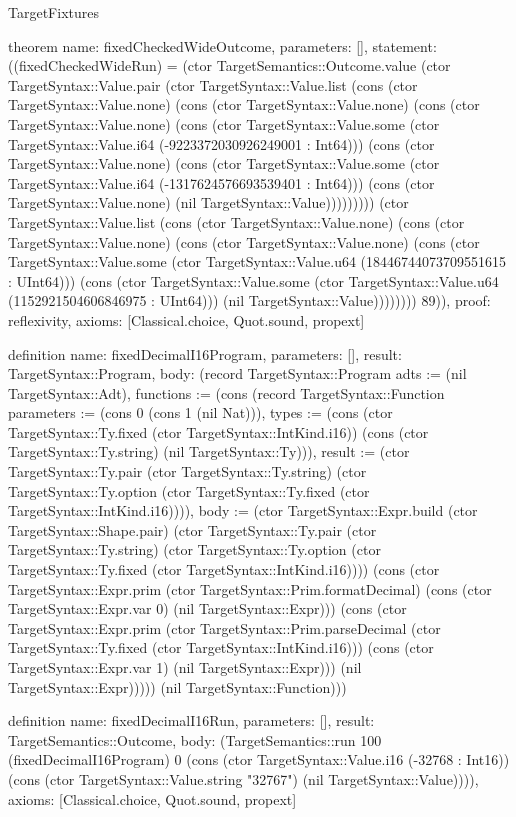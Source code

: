 \begin{lexlean}{TargetFixtures}
\begin{semanticmodule}
theorem{
  name: fixedCheckedWideOutcome,
  parameters: [],
  statement: ((fixedCheckedWideRun) = (ctor TargetSemantics::Outcome.value (ctor TargetSyntax::Value.pair (ctor TargetSyntax::Value.list (cons (ctor TargetSyntax::Value.none) (cons (ctor TargetSyntax::Value.none) (cons (ctor TargetSyntax::Value.none) (cons (ctor TargetSyntax::Value.some (ctor TargetSyntax::Value.i64 (-9223372030926249001 : Int64))) (cons (ctor TargetSyntax::Value.none) (cons (ctor TargetSyntax::Value.some (ctor TargetSyntax::Value.i64 (-1317624576693539401 : Int64))) (cons (ctor TargetSyntax::Value.none) (nil TargetSyntax::Value))))))))) (ctor TargetSyntax::Value.list (cons (ctor TargetSyntax::Value.none) (cons (ctor TargetSyntax::Value.none) (cons (ctor TargetSyntax::Value.none) (cons (ctor TargetSyntax::Value.some (ctor TargetSyntax::Value.u64 (18446744073709551615 : UInt64))) (cons (ctor TargetSyntax::Value.some (ctor TargetSyntax::Value.u64 (1152921504606846975 : UInt64))) (nil TargetSyntax::Value)))))))) 89)),
  proof: reflexivity{},
  axioms: [Classical.choice, Quot.sound, propext]
}

definition{
  name: fixedDecimalI16Program,
  parameters: [],
  result: TargetSyntax::Program,
  body: (record TargetSyntax::Program {adts := (nil TargetSyntax::Adt), functions := (cons (record TargetSyntax::Function {parameters := (cons 0 (cons 1 (nil Nat))), types := (cons (ctor TargetSyntax::Ty.fixed (ctor TargetSyntax::IntKind.i16)) (cons (ctor TargetSyntax::Ty.string) (nil TargetSyntax::Ty))), result := (ctor TargetSyntax::Ty.pair (ctor TargetSyntax::Ty.string) (ctor TargetSyntax::Ty.option (ctor TargetSyntax::Ty.fixed (ctor TargetSyntax::IntKind.i16)))), body := (ctor TargetSyntax::Expr.build (ctor TargetSyntax::Shape.pair) (ctor TargetSyntax::Ty.pair (ctor TargetSyntax::Ty.string) (ctor TargetSyntax::Ty.option (ctor TargetSyntax::Ty.fixed (ctor TargetSyntax::IntKind.i16)))) (cons (ctor TargetSyntax::Expr.prim (ctor TargetSyntax::Prim.formatDecimal) (cons (ctor TargetSyntax::Expr.var 0) (nil TargetSyntax::Expr))) (cons (ctor TargetSyntax::Expr.prim (ctor TargetSyntax::Prim.parseDecimal (ctor TargetSyntax::Ty.fixed (ctor TargetSyntax::IntKind.i16))) (cons (ctor TargetSyntax::Expr.var 1) (nil TargetSyntax::Expr))) (nil TargetSyntax::Expr))))}) (nil TargetSyntax::Function))})
}

definition{
  name: fixedDecimalI16Run,
  parameters: [],
  result: TargetSemantics::Outcome,
  body: (TargetSemantics::run 100 (fixedDecimalI16Program) 0 (cons (ctor TargetSyntax::Value.i16 (-32768 : Int16)) (cons (ctor TargetSyntax::Value.string "32767") (nil TargetSyntax::Value)))),
  axioms: [Classical.choice, Quot.sound, propext]
}


\end{semanticmodule}
\end{lexlean}
